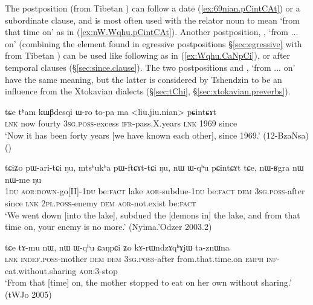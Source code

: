 The postposition  (from Tibetan ) can follow a date (\ref{ex:69nian.pCintCAt}) or a subordinate clause, and is most often used with the relator noun  to mean `from that time on' as in (\ref{ex:nW.Wqhu.pCintCAt}). Another postposition,  , `from ... on' (combining the  element found in egressive postpositions §\ref{sec:egressive}  with  from Tibetan ) can be used like  following   as in (\ref{ex:Wqhu.CaNpCi}), or after temporal clauses (§\ref{sec:since.clause}). The two postpositions  and , `from ... on' have the same meaning, but the latter is considered by Tshendzin to be an influence from the Xtokavian dialects (§\ref{sec:tChi}, §\ref{sec:xtokavian.preverbs}).

 \begin{exe}
\ex \label{ex:69nian.pCintCAt}
 \gll tɕe tʰam kɯβdesqi ɯ-ro to-pa ma <liu.jiu.nian> pɕintɕɤt \\
 \textsc{lnk} now fourty \textsc{3sg}.\textsc{poss}-excess \textsc{ifr}-pass.X.years \textsc{lnk}  1969 since \\
 \glt `Now it has been forty years [we have known each other], since 1969.' (12-BzaNsa) ()
 \end{exe}
 
  \begin{exe}
\ex \label{ex:nW.Wqhu.pCintCAt}
 \gll  tɕiʑo pɯ-ari-tɕi ŋu, mtsʰukʰa pɯ-ftɕɤt-tɕi ŋu, nɯ ɯ-qʰu pɕintɕɤt tɕe, nɯ-ʁgra nɯ nɯ-me ŋu \\
 \textsc{1du} \textsc{aor}:\textsc{down}-go[II]-\textsc{1du} be:\textsc{fact} lake \textsc{aor}-subdue-\textsc{1du} be:\textsc{fact} \textsc{dem} \textsc{3sg}.\textsc{poss}-after since \textsc{lnk} \textsc{2pl}.\textsc{poss}-enemy \textsc{dem} \textsc{aor}-not.exist be:\textsc{fact} \\
 \glt `We went down [into the lake], subdued the [demons in] the lake, and from that time on, your enemy is no more.' (Nyima.'Odzer 2003.2)
 \end{exe}
 
 \begin{exe}
\ex \label{ex:Wqhu.CaNpCi}
\gll  tɕe tɤ-mu nɯ, nɯ ɯ-qʰu ɕaŋpɕi ʑo kɤ-rɯndzɤqʰɤjɯ ta-znɯna \\
\textsc{lnk} \textsc{indef}.\textsc{poss}-mother \textsc{dem} \textsc{dem} \textsc{3sg}.\textsc{poss}-after from.that.time.on \textsc{emph} \textsc{inf}-eat.without.sharing \textsc{aor}:3\flobv{}-stop \\
\glt `From that [time] on, the mother stopped to eat on her own without sharing.' (tWJo 2005) 
\end{exe}

